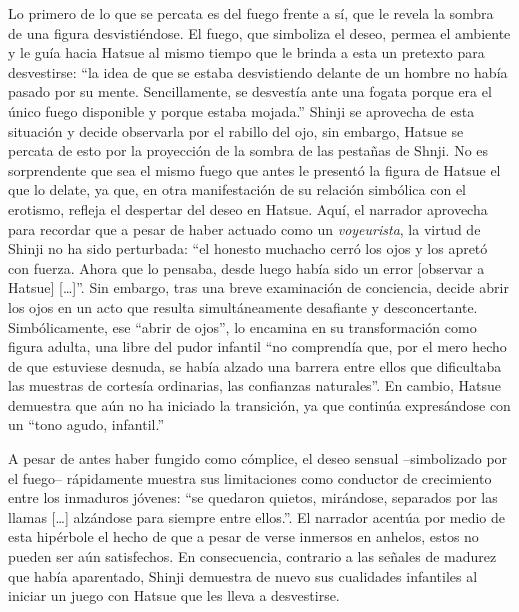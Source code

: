 Lo primero de lo que se percata es del fuego frente a sí, que le revela la sombra de una figura desvistiéndose. El fuego, que simboliza el deseo, permea el ambiente y le guía hacia Hatsue al mismo tiempo que le brinda a esta un pretexto para desvestirse: ``la idea de que se estaba desvistiendo delante de un hombre no había pasado por su mente. Sencillamente, se desvestía ante una fogata porque era el único fuego disponible y porque estaba mojada.'' \autocite{mishima2006}
Shinji se aprovecha de esta situación y decide observarla por el rabillo del ojo, sin embargo, Hatsue se percata de esto por la proyección de la sombra de las pestañas de Shnji.
No es sorprendente que sea el mismo fuego que antes le presentó la figura de Hatsue el que lo delate, ya que, en otra manifestación de su relación simbólica con el erotismo, refleja el despertar del deseo en Hatsue.
Aquí, el narrador aprovecha para recordar que a pesar de haber actuado como un \emph{voyeurista}, la virtud de Shinji no ha sido perturbada: ``el honesto muchacho cerró los ojos y los apretó con fuerza. Ahora que lo pensaba, desde luego había sido un error [observar a Hatsue] [\ldots]''\autocite{mishima2006}.
Sin embargo, tras una breve examinación de conciencia, decide abrir los ojos en un acto que resulta simultáneamente desafiante y desconcertante.
Simbólicamente, ese ``abrir de ojos'', lo encamina en su transformación como figura adulta, una libre del pudor infantil ``no comprendía que, por el mero hecho de que estuviese desnuda, se había alzado una barrera entre ellos que dificultaba las muestras de cortesía ordinarias, las confianzas naturales''.\autocite{mishima2006}
En cambio, Hatsue demuestra que aún no ha iniciado la transición, ya que continúa expresándose con un ``tono agudo, infantil.''\autocite{mishima2006}

A pesar de antes haber fungido como cómplice, el deseo sensual --simbolizado por el fuego-- rápidamente muestra sus limitaciones como conductor de crecimiento entre los inmaduros jóvenes: ``se quedaron quietos, mirándose, separados por las llamas [\ldots] alzándose para siempre entre ellos.''.\autocite{mishima2006}
El narrador acentúa por medio de esta hipérbole el hecho de que a pesar de verse inmersos en anhelos, estos no pueden ser aún satisfechos. En consecuencia, contrario a las señales de madurez que había aparentado, Shinji demuestra de nuevo sus cualidades infantiles al iniciar un juego con Hatsue que les lleva a desvestirse.

